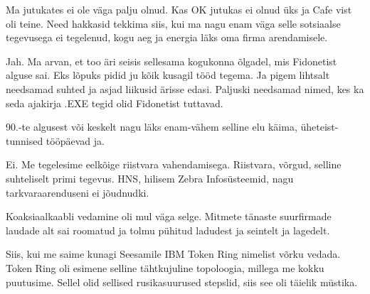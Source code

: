 
Ma jutukates ei ole väga palju olnud. Kas OK jutukas ei olnud 
üks ja Cafe vist oli teine. Need hakkasid tekkima siis, kui 
ma nagu enam väga selle sotsiaalse tegevusega ei tegelenud, kogu aeg ja energia 
läks oma firma arendamisele.
                 

Jah. Ma arvan, et too äri seisis sellesama kogukonna õlgadel, mis Fidonetist  
alguse sai. Eks lõpuks pidid ju kõik kusagil tööd tegema. Ja pigem lihtsalt 
needsamad suhted ja asjad liikusid ärisse edasi. Paljuski needsamad nimed, kes 
ka seda ajakirja .EXE tegid olid Fidonetist tuttavad. 


90.-te algusest või keskelt nagu läks enam-vähem selline elu käima, üheteist-tunnised 
tööpäevad ja. 


Ei. Me tegelesime eelkõige riistvara vahendamisega. Riistvara, võrgud, selline 
suhteliselt primi tegevus. HNS,  hilisem Zebra 
Infosüsteemid, nagu tarkvaraarenduseni ei jõudnudki.


Koaksiaalkaabli vedamine oli mul väga selge. Mitmete tänaste suurfirmade 
laudade alt sai roomatud ja tolmu pühitud ladudest ja seintelt ja lagedelt.


Siis, kui me saime kunagi Seesamile IBM Token Ring 
nimelist võrku vedada. Token Ring oli 
 esimene selline tähtkujuline topoloogia, millega me kokku puutusime. Sellel  
olid sellised rusikasuurused stepslid, siis see oli täielik müstika.
 

